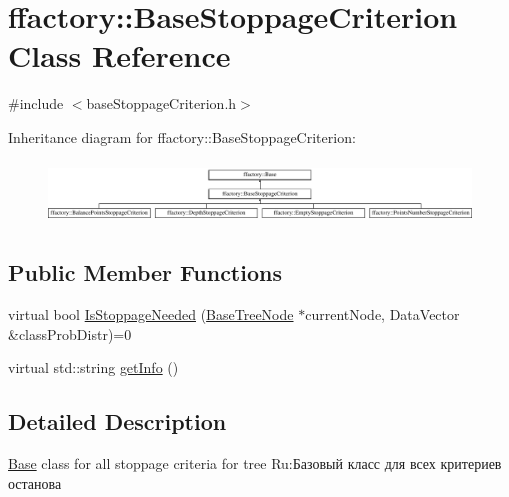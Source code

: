 \hypertarget{classffactory_1_1_base_stoppage_criterion}{\section{ffactory\-:\-:Base\-Stoppage\-Criterion Class Reference}
\label{classffactory_1_1_base_stoppage_criterion}
}


{\ttfamily \#include $<$base\-Stoppage\-Criterion.\-h$>$}

Inheritance diagram for ffactory\-:\-:Base\-Stoppage\-Criterion\-:\begin{figure}[H]
\begin{center}
\leavevmode
\includegraphics[height=1.666667cm]{classffactory_1_1_base_stoppage_criterion}
\end{center}
\end{figure}
\subsection*{Public Member Functions}
\begin{DoxyCompactItemize}
\item 
virtual bool \hyperlink{classffactory_1_1_base_stoppage_criterion_a47728f0c9b241133e228ea5956248241}{Is\-Stoppage\-Needed} (\hyperlink{classffactory_1_1_base_tree_node}{Base\-Tree\-Node} $\ast$current\-Node, Data\-Vector \&class\-Prob\-Distr)=0
\item 
virtual std\-::string \hyperlink{classffactory_1_1_base_stoppage_criterion_a0543f9c748cb8092e08314a8d2d40c79}{get\-Info} ()
\end{DoxyCompactItemize}


\subsection{Detailed Description}
\hyperlink{classffactory_1_1_base}{Base} class for all stoppage criteria for tree Ru\-:Базовый класс для всех критериев останова 


